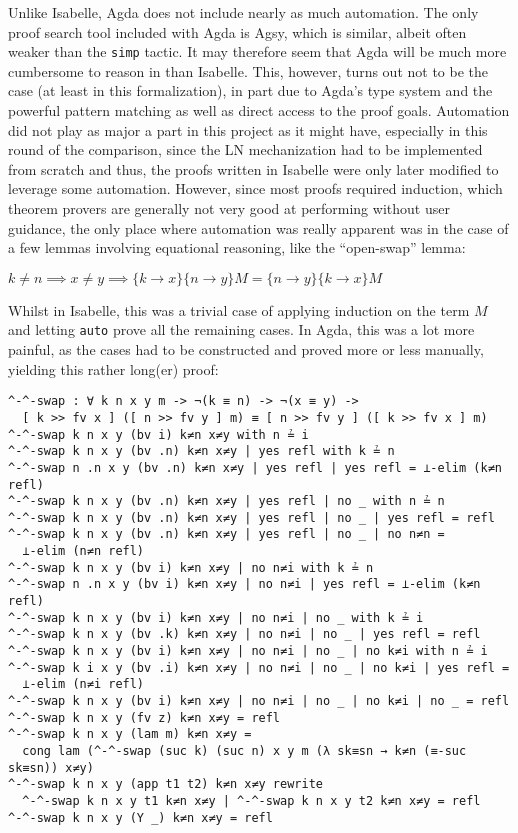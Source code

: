 \documentclass[a4paper, 12pt, twoside]{style/ociamthesis}
\theoremstyle{plain}
\theoremstyle{definition}
\newtheorem{Lemma}{Lemma}[chapter]
\theoremstyle{remark}
\renewenvironment{Lemma}{\begin{OldLemma}\begin{mdframed}[style=example, linecolor=cyan]}{\end{mdframed}\end{OldLemma}}
\begin{document}
Unlike Isabelle, Agda does not include nearly as much automation. The
only proof search tool included with Agda is Agsy, which is similar,
albeit often weaker than the \texttt{simp} tactic. It may therefore seem
that Agda will be much more cumbersome to reason in than Isabelle. This,
however, turns out not to be the case (at least in this formalization),
in part due to Agda's type system and the powerful pattern matching as
well as direct access to the proof goals. Automation did not play as
major a part in this project as it might have, especially in this round
of the comparison, since the LN mechanization had to be implemented from
scratch and thus, the proofs written in Isabelle were only later
modified to leverage some automation. However, since most proofs
required induction, which theorem provers are generally not very good at
performing without user guidance, the only place where automation was
really apparent was in the case of a few lemmas involving equational
reasoning, like the ``open-swap'' lemma:

\begin{Lemma}

\label{Lemma:opnSwap}
\(k \neq n \implies x \neq y \implies \{k \to x\}\{n \to y\}M = \{n \to y\}\{k \to x\}M\)

\end{Lemma}

Whilst in Isabelle, this was a trivial case of applying induction on the
term \(M\) and letting \texttt{auto} prove all the remaining cases. In
Agda, this was a lot more painful, as the cases had to be constructed
and proved more or less manually, yielding this rather long(er) proof:

\begin{verbatim}
^-^-swap : ∀ k n x y m -> ¬(k ≡ n) -> ¬(x ≡ y) -> 
  [ k >> fv x ] ([ n >> fv y ] m) ≡ [ n >> fv y ] ([ k >> fv x ] m)
^-^-swap k n x y (bv i) k≠n x≠y with n ≟ i
^-^-swap k n x y (bv .n) k≠n x≠y | yes refl with k ≟ n
^-^-swap n .n x y (bv .n) k≠n x≠y | yes refl | yes refl = ⊥-elim (k≠n refl)
^-^-swap k n x y (bv .n) k≠n x≠y | yes refl | no _ with n ≟ n
^-^-swap k n x y (bv .n) k≠n x≠y | yes refl | no _ | yes refl = refl
^-^-swap k n x y (bv .n) k≠n x≠y | yes refl | no _ | no n≠n = 
  ⊥-elim (n≠n refl)
^-^-swap k n x y (bv i) k≠n x≠y | no n≠i with k ≟ n
^-^-swap n .n x y (bv i) k≠n x≠y | no n≠i | yes refl = ⊥-elim (k≠n refl)
^-^-swap k n x y (bv i) k≠n x≠y | no n≠i | no _ with k ≟ i
^-^-swap k n x y (bv .k) k≠n x≠y | no n≠i | no _ | yes refl = refl
^-^-swap k n x y (bv i) k≠n x≠y | no n≠i | no _ | no k≠i with n ≟ i
^-^-swap k i x y (bv .i) k≠n x≠y | no n≠i | no _ | no k≠i | yes refl = 
  ⊥-elim (n≠i refl)
^-^-swap k n x y (bv i) k≠n x≠y | no n≠i | no _ | no k≠i | no _ = refl
^-^-swap k n x y (fv z) k≠n x≠y = refl
^-^-swap k n x y (lam m) k≠n x≠y = 
  cong lam (^-^-swap (suc k) (suc n) x y m (λ sk≡sn → k≠n (≡-suc sk≡sn)) x≠y)
^-^-swap k n x y (app t1 t2) k≠n x≠y rewrite
  ^-^-swap k n x y t1 k≠n x≠y | ^-^-swap k n x y t2 k≠n x≠y = refl
^-^-swap k n x y (Y _) k≠n x≠y = refl
\end{verbatim}
\end{document}
